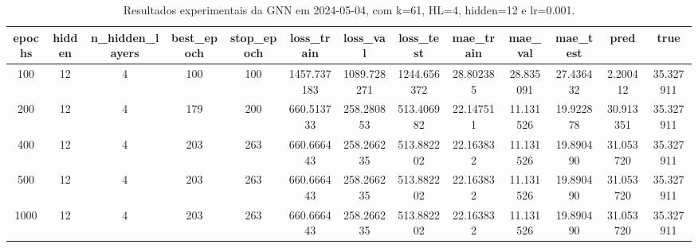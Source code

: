 \begin{table}[h]
\centering
\caption{Resultados experimentais da GNN em 2024-05-04, com k=61, HL=4, hidden=12 e lr=0.001.}
\label{tab:gnn_results_k61_hl4_h12_d20240504}
\begin{tabular}{ccccccccccccc}
\toprule
epochs & hidden & n\_hidden\_layers & best\_epoch & stop\_epoch & loss\_train & loss\_val & loss\_test & mae\_train & mae\_val & mae\_test & pred & true \\
\midrule
100 & 12 & 4 & 100 & 100 & 1457.737183 & 1089.728271 & 1244.656372 & 28.802385 & 28.835091 & 27.436432 & 2.200412 & 35.327911 \\
200 & 12 & 4 & 179 & 200 & 660.513733 & 258.280853 & 513.406982 & 22.147511 & 11.131526 & 19.922878 & 30.913351 & 35.327911 \\
400 & 12 & 4 & 203 & 263 & 660.666443 & 258.266235 & 513.882202 & 22.163832 & 11.131526 & 19.890490 & 31.053720 & 35.327911 \\
500 & 12 & 4 & 203 & 263 & 660.666443 & 258.266235 & 513.882202 & 22.163832 & 11.131526 & 19.890490 & 31.053720 & 35.327911 \\
1000 & 12 & 4 & 203 & 263 & 660.666443 & 258.266235 & 513.882202 & 22.163832 & 11.131526 & 19.890490 & 31.053720 & 35.327911 \\
\bottomrule
\end{tabular}
\end{table}
